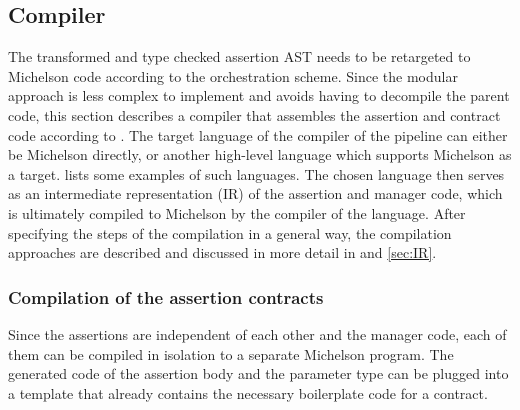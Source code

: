 \subsection{Compiler}\label{sec:compiler}
The transformed and type checked assertion AST needs to be retargeted to Michelson code according to the orchestration scheme. Since the modular approach is less complex to implement and avoids having to decompile the parent code, this section describes a compiler that assembles the assertion and contract code according to . The target language of the compiler of the pipeline can either be Michelson directly, or another high-level language which supports Michelson as a target.  lists some examples of such languages. The chosen language then serves as an intermediate representation (IR) of the assertion and manager code, which is ultimately compiled to Michelson by the compiler of the language. After specifying the steps of the compilation in a general way, the compilation approaches are described and discussed in more detail in  and \ref{sec:IR}.

\subsubsection{Compilation of the assertion contracts}
Since the assertions are independent of each other and the manager code, each of them can be compiled in isolation to a separate Michelson program. The generated code of the assertion body and the parameter type can be plugged into a template that already contains the necessary boilerplate code for a contract.


